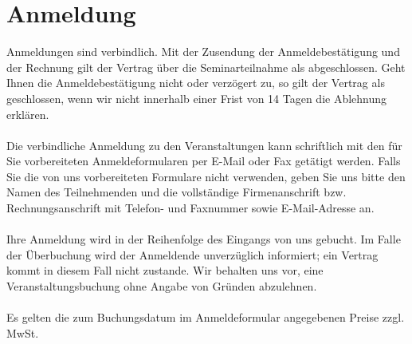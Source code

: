 \documentclass[a4paper, 12pt]{scrartcl}
\begin{document}
    \section{Anmeldung}
    Anmeldungen sind verbindlich. Mit der Zusendung der Anmeldebestätigung und der Rechnung gilt der Vertrag über die Seminarteilnahme als abgeschlossen. Geht Ihnen die Anmeldebestätigung nicht oder verzögert zu, so gilt der Vertrag als geschlossen, wenn wir nicht innerhalb einer Frist von 14 Tagen die Ablehnung erklären. \\ \\ \noindent
Die verbindliche Anmeldung zu den Veranstaltungen kann schriftlich mit den für Sie vorbereiteten Anmeldeformularen per E-Mail oder Fax getätigt werden. Falls Sie die von uns vorbereiteten Formulare nicht verwenden, geben Sie uns bitte den Namen des Teilnehmenden und die vollständige Firmenanschrift bzw. Rechnungsanschrift mit Telefon- und Faxnummer sowie E-Mail-Adresse an. \\ \\ \noindent
Ihre Anmeldung wird in der Reihenfolge des Eingangs von uns gebucht. Im Falle der Überbuchung wird der Anmeldende unverzüglich informiert; ein Vertrag kommt in diesem Fall nicht zustande.
Wir behalten uns vor, eine Veranstaltungsbuchung ohne Angabe von Gr\"unden abzulehnen. \\ \\ \noindent
Es gelten die zum Buchungsdatum im Anmeldeformular angegebenen Preise zzgl. MwSt.
\end{document}
